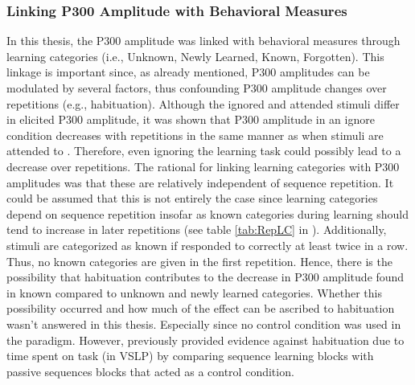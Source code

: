 \subsubsection{Linking P300 Amplitude with Behavioral Measures}
In this thesis, the P300 amplitude was linked with behavioral measures through learning categories (i.e., Unknown, Newly Learned, Known, Forgotten). This linkage is important since, as already mentioned, P300 amplitudes can be modulated by several factors, thus confounding P300 amplitude changes over repetitions (e.g., habituation). Although the ignored and attended stimuli differ in elicited P300 amplitude, it was shown that P300 amplitude in an ignore condition decreases with repetitions in the same manner as when stimuli are attended to \parencite{beckerDirectingAttentionStimuli1980}. Therefore, even ignoring the learning task could possibly lead to a decrease over repetitions. The rational for linking learning categories with P300 amplitudes was that these are relatively independent of sequence repetition. It could be assumed that this is not entirely the case since learning categories depend on sequence repetition insofar as known categories during learning should tend to increase in later repetitions (see table \ref{tab:RepLC} in ). Additionally, stimuli are categorized as known if responded to correctly at least twice in a row. Thus, no known categories are given in the first repetition. Hence, there is the possibility that habituation contributes to the decrease in P300 amplitude found in known compared to unknown and newly learned categories. Whether this possibility occurred and how much of the effect can be ascribed to habituation wasn't answered in this thesis. Especially since no control condition was used in the paradigm. However, \textcite{steinemannTrackingNeuralCorrelates2016} previously provided evidence against habituation due to time spent on task (in VSLP) by comparing sequence learning blocks with passive sequences blocks that acted as a control condition.   

